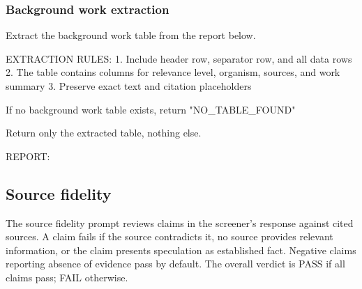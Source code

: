 \documentclass[12pt]{article}
\begin{document}
\subsubsection{Background work extraction}

\begin{promptlisting}
Extract the background work table from the report below.

EXTRACTION RULES:
1. Include header row, separator row, and all data rows
2. The table contains columns for relevance level, organism,
   sources, and work summary
3. Preserve exact text and citation placeholders

If no background work table exists, return "NO_TABLE_FOUND"

Return only the extracted table, nothing else.

REPORT:
\end{promptlisting}

\subsection{Source fidelity}

The source fidelity prompt reviews claims in the screener's response against cited sources. A claim fails if the source contradicts it, no source provides relevant information, or the claim presents speculation as established fact. Negative claims reporting absence of evidence pass by default. The overall verdict is PASS if all claims pass; FAIL otherwise.
\end{document}
